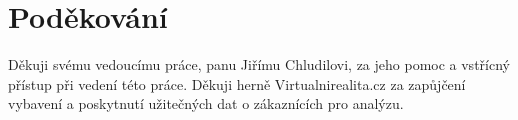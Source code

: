 \section{Poděkování}\label{podux11bkovuxe1nuxed}

Děkuji svému vedoucímu práce, panu Jiřímu Chludilovi, za jeho pomoc a
vstřícný přístup při vedení této práce. Děkuji herně Virtualnirealita.cz
za zapůjčení vybavení a poskytnutí užitečných dat o zákaznících pro
analýzu.
